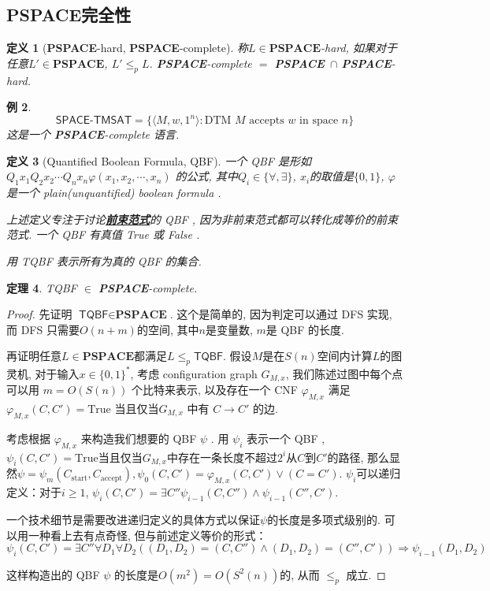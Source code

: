 \documentclass[8pt]{article}
\theoremstyle{compact}
\newtheorem{theorem}{定理}[section]
\newtheorem{definition}[theorem]{定义}
\newtheorem{example}[theorem]{例}
\def\obj#1{\textbf{\uline{#1}}}
\def\le{\leqslant}
\def\ge{\geqslant}
\def\PSPACE{\textbf{PSPACE}}
\begin{document}
\subsection{\PSPACE 完全性}
\begin{definition}[\PSPACE-hard, \PSPACE-complete]
	称$L \in \PSPACE$-hard, 如果对于任意$L' \in \PSPACE$, $L' \le_p L$. \PSPACE-complete $=$ \PSPACE\ $\cap$ \PSPACE-hard.  
\end{definition}
\begin{example}
	$$\textsf{SPACE-TMSAT} = \{ \langle M, w, 1^n \rangle : \textrm{DTM } M \textrm{ accepts } w \textrm{ in space } n \}$$
	这是一个 \PSPACE-complete 语言. 
\end{example}
\begin{definition}[Quantified Boolean Formula, QBF]
	一个 QBF 是形如 $Q_1x_1Q_2x_2 \cdots Q_nx_n \varphi(x_1, x_2, \cdots, x_n)$ 的公式, 其中$Q_i \in \{\forall, \exists\}$, $x_i$的取值是$\{0, 1\}$, $\varphi$是一个 plain(unquantified) boolean formula . 

	上述定义专注于讨论\obj{前束范式}的 QBF , 因为非前束范式都可以转化成等价的前束范式. 一个 QBF 有真值 True 或 False . 

	用 \textsf{TQBF} 表示所有为真的 QBF 的集合. 
\end{definition}
\begin{theorem}
	\textsf{TQBF} $\in$ \PSPACE-complete.
	\label{TQBF}
\end{theorem}
\begin{proof}
	先证明 $\textsf{TQBF} \in \PSPACE$. 这个是简单的, 因为判定可以通过 DFS 实现, 而 DFS 只需要$O(n + m)$的空间, 其中$n$是变量数, $m$是 QBF 的长度. 

	再证明任意$L \in \PSPACE$都满足$L \le_p \textsf{TQBF}$. 假设$M$是在$S(n)$空间内计算$L$的图灵机, 对于输入$x \in \{0, 1\}^*$, 考虑 configuration graph $G_{M, x}$, 我们陈述过图中每个点可以用 $m = O(S(n))$ 个比特来表示, 以及存在一个 CNF $\varphi_{M, x}$ 满足$\varphi_{M, x}(C, C') = \textrm{True}$ 当且仅当$G_{M, x}$ 中有 $C \to C'$ 的边. 

	考虑根据 $\varphi_{M, x}$ 来构造我们想要的 QBF $\psi$ . 用 $\psi_i$ 表示一个 QBF , $\psi_i(C, C') = \textrm{True}$当且仅当$G_{M, x}$中存在一条长度不超过$2^i$从$C$到$C'$的路径, 那么显然$\psi = \psi_m(C_{\text{start}}, C_{\text{accept}}), \psi_0(C, C') = \varphi_{M, x}(C, C') \vee (C = C')$. $\psi_i$可以递归定义：对于$i \ge 1$, $\psi_i(C, C') = \exists C'' \psi_{i-1}(C, C'') \wedge \psi_{i-1}(C'', C')$. 

	一个技术细节是需要改进递归定义的具体方式以保证$\psi$的长度是多项式级别的. 可以用一种看上去有点奇怪, 但与前述定义等价的形式：
	$$\psi_i(C, C') = \exists C''\forall D_1 \forall D_2 ((D_1, D_2) = (C, C'') \wedge (D_1, D_2) = (C'', C')) \Rightarrow \psi_{i-1}(D_1, D_2)$$

	这样构造出的 QBF $\psi$ 的长度是$O(m^2) = O(S^2(n))$的, 从而 $\le_p$ 成立.
\end{proof}
\end{document}
